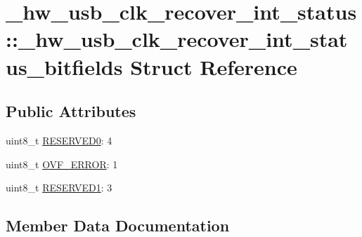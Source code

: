 \hypertarget{struct__hw__usb__clk__recover__int__status_1_1__hw__usb__clk__recover__int__status__bitfields}{}\section{\+\_\+hw\+\_\+usb\+\_\+clk\+\_\+recover\+\_\+int\+\_\+status\+:\+:\+\_\+hw\+\_\+usb\+\_\+clk\+\_\+recover\+\_\+int\+\_\+status\+\_\+bitfields Struct Reference}
\label{struct__hw__usb__clk__recover__int__status_1_1__hw__usb__clk__recover__int__status__bitfields}
\subsection*{Public Attributes}
\begin{DoxyCompactItemize}
\item 
uint8\+\_\+t \hyperlink{struct__hw__usb__clk__recover__int__status_1_1__hw__usb__clk__recover__int__status__bitfields_aead08c95dc2f7c32cef148afab6b3736}{R\+E\+S\+E\+R\+V\+E\+D0}\+: 4
\item 
uint8\+\_\+t \hyperlink{struct__hw__usb__clk__recover__int__status_1_1__hw__usb__clk__recover__int__status__bitfields_a7ae8ab0498a1a912ed63cf95fa7fed11}{O\+V\+F\+\_\+\+E\+R\+R\+OR}\+: 1
\item 
uint8\+\_\+t \hyperlink{struct__hw__usb__clk__recover__int__status_1_1__hw__usb__clk__recover__int__status__bitfields_adfb8357ac7bca278d5626b2ad408fd18}{R\+E\+S\+E\+R\+V\+E\+D1}\+: 3
\end{DoxyCompactItemize}


\subsection{Member Data Documentation}
